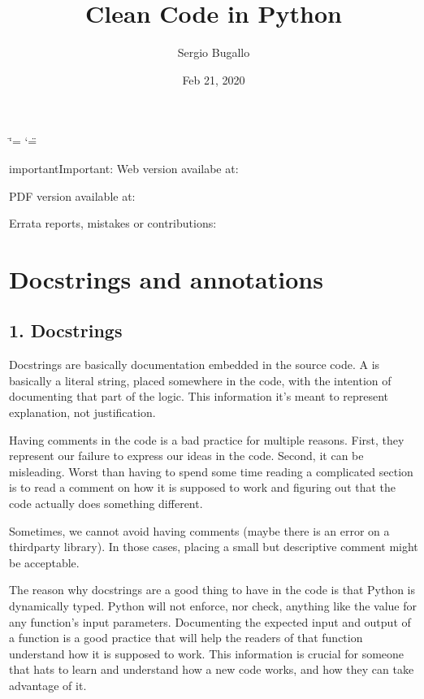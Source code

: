 \documentclass[a4paper,10pt,english]{sphinxmanual}
\title{Clean Code in Python}
\date{Feb 21, 2020}
\author{Sergio Bugallo}
\begin{document}
\ifdefined\shorthandoff
  \ifnum\catcode`\=\string=\active\shorthandoff{=}\fi
  \ifnum\catcode`\"=\active{}\fi
\fi

\pagestyle{empty}
\sphinxmaketitle
\pagestyle{plain}
\sphinxtableofcontents
\pagestyle{normal}
\label{\detokenize{index::doc}}


\begin{sphinxadmonition}{important}{Important:}
Web version availabe at: 

PDF version available at: 

Errata reports, mistakes or contributions: 
\end{sphinxadmonition}


\chapter{Docstrings and annotations}
\label{\detokenize{chapters/1_docstrings_and_annotations/index:docstrings-and-annotations}}\label{\detokenize{chapters/1_docstrings_and_annotations/index::doc}}

\section{1. Docstrings}
\label{\detokenize{chapters/1_docstrings_and_annotations/index:docstrings}}
Docstrings are basically documentation embedded in the source code. A  is basically a literal
string, placed somewhere in the code, with the intention of documenting that part of the logic. This
information it’s meant to represent explanation, not justification.

Having comments in the code is a bad practice for multiple reasons. First, they represent our failure to
express our ideas in the code. Second, it can be misleading. Worst than having to spend some time reading a
complicated section is to read a comment on how it is supposed to work and figuring out that the code
actually does something different.

Sometimes, we cannot avoid having comments (maybe there is an error on a third\sphinxhyphen{}party library). In those cases,
placing a small but descriptive comment might be acceptable.

The reason why docstrings are a good thing to have in the code is that Python is dynamically typed. Python
will not enforce, nor check, anything like the value for any function’s input parameters. Documenting the
expected input and output of a function is a good practice that will help the readers of that function
understand how it is supposed to work. This information is crucial for someone that hats to learn and
understand how a new code works, and how they can take advantage of it.
\end{document}
